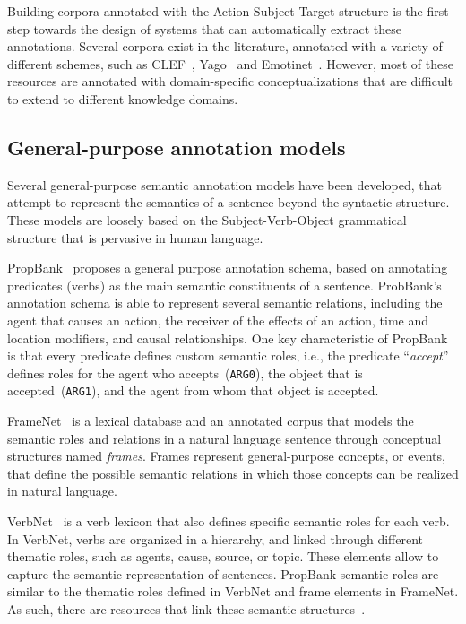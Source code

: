 Building corpora annotated with the Action-Subject-Target structure is the first step towards the design of systems that can automatically extract these annotations. Several corpora exist in the literature, annotated with a variety of different schemes, such as CLEF~\cite{kelly2016overview}, Yago~\cite{fabian2007yago} and Emotinet~\cite{emotinet}.
However, most of these resources are annotated with domain-specific conceptualizations that are difficult to extend to different knowledge domains.

  \subsection{General-purpose annotation models}\label{sec:general}

  Several general-purpose semantic annotation models have been developed, that attempt to represent the semantics of a sentence beyond the syntactic structure.
  These models are loosely based on the Subject-Verb-Object grammatical structure that is pervasive in human language.

  PropBank~\cite{propbank} proposes a general purpose annotation schema, based on annotating predicates (verbs) as the main semantic constituents of a sentence. ProbBank's annotation schema is able to represent several semantic relations, including the agent that causes an action, the receiver of the effects of an action, time and location modifiers, and causal relationships.
  One key characteristic of PropBank is that every predicate defines custom semantic roles, i.e., the predicate ``\textit{accept}'' defines roles for the agent who accepts~(\texttt{ARG0}), the object that is accepted~(\texttt{ARG1}), and the agent from whom that object is accepted.

  FrameNet~\cite{framenet} is a lexical database and an annotated corpus that models the semantic roles and relations in a natural language sentence through conceptual structures named \textit{frames}. Frames represent general-purpose concepts, or events, that define the possible semantic relations in which those concepts can be realized in natural language.

  VerbNet~\cite{verbnet} is a verb lexicon that also defines specific semantic roles for each verb. In VerbNet, verbs are organized in a hierarchy, and linked through different thematic roles, such as agents, cause, source, or topic. These elements allow to capture the semantic representation of sentences.
  PropBank semantic roles are similar to the thematic roles defined in VerbNet and frame elements in FrameNet. As such, there are resources that link these semantic structures~\cite{semlink}.

